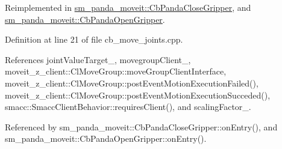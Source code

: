 Reimplemented in \hyperlink{classsm__panda__moveit_1_1CbPandaCloseGripper_a755e506a4c47ec5f1485f2526c8a9e16}{sm\+\_\+panda\+\_\+moveit\+::\+Cb\+Panda\+Close\+Gripper}, and \hyperlink{classsm__panda__moveit_1_1CbPandaOpenGripper_ace4c87d312e8343fcf392f43956f954f}{sm\+\_\+panda\+\_\+moveit\+::\+Cb\+Panda\+Open\+Gripper}.



Definition at line 21 of file cb\+\_\+move\+\_\+joints.\+cpp.



References joint\+Value\+Target\+\_\+, movegroup\+Client\+\_\+, moveit\+\_\+z\+\_\+client\+::\+Cl\+Move\+Group\+::move\+Group\+Client\+Interface, moveit\+\_\+z\+\_\+client\+::\+Cl\+Move\+Group\+::post\+Event\+Motion\+Execution\+Failed(), moveit\+\_\+z\+\_\+client\+::\+Cl\+Move\+Group\+::post\+Event\+Motion\+Execution\+Succeded(), smacc\+::\+Smacc\+Client\+Behavior\+::requires\+Client(), and scaling\+Factor\+\_\+.



Referenced by sm\+\_\+panda\+\_\+moveit\+::\+Cb\+Panda\+Close\+Gripper\+::on\+Entry(), and sm\+\_\+panda\+\_\+moveit\+::\+Cb\+Panda\+Open\+Gripper\+::on\+Entry().


